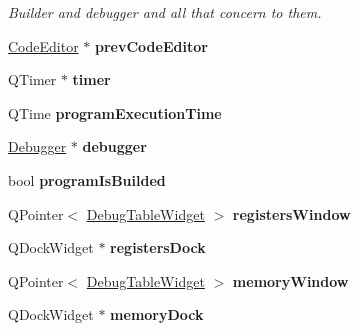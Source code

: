 \begin{DoxyCompactItemize}
\begin{DoxyCompactList}\small\item\em Builder and debugger and all that concern to them. \end{DoxyCompactList}\item 
\hypertarget{class_main_window_a0781f612c0eee901117a42f3fa457683}{}\hyperlink{class_code_editor}{Code\+Editor} $\ast$ {\bfseries prev\+Code\+Editor}\label{class_main_window_a0781f612c0eee901117a42f3fa457683}

\item 
\hypertarget{class_main_window_a356578805ed1248a7f2807434cb0e5ee}{}Q\+Timer $\ast$ {\bfseries timer}\label{class_main_window_a356578805ed1248a7f2807434cb0e5ee}

\item 
\hypertarget{class_main_window_a532375be374a745d71c38659afc235ea}{}Q\+Time {\bfseries program\+Execution\+Time}\label{class_main_window_a532375be374a745d71c38659afc235ea}

\item 
\hypertarget{class_main_window_ade3454d10164efa50487db71a9e2fbd9}{}\hyperlink{class_debugger}{Debugger} $\ast$ {\bfseries debugger}\label{class_main_window_ade3454d10164efa50487db71a9e2fbd9}

\item 
\hypertarget{class_main_window_a393e70c554043c77c719373122d8fb31}{}bool {\bfseries program\+Is\+Builded}\label{class_main_window_a393e70c554043c77c719373122d8fb31}

\item 
\hypertarget{class_main_window_a765bcdb2472bb408de635274ba564f0b}{}Q\+Pointer$<$ \hyperlink{class_debug_table_widget}{Debug\+Table\+Widget} $>$ {\bfseries registers\+Window}\label{class_main_window_a765bcdb2472bb408de635274ba564f0b}

\item 
\hypertarget{class_main_window_ae29651235c4b3e55b1475e53c949d396}{}Q\+Dock\+Widget $\ast$ {\bfseries registers\+Dock}\label{class_main_window_ae29651235c4b3e55b1475e53c949d396}

\item 
\hypertarget{class_main_window_acfa36ea58edc35ba9c1ccf85d5eb4d4c}{}Q\+Pointer$<$ \hyperlink{class_debug_table_widget}{Debug\+Table\+Widget} $>$ {\bfseries memory\+Window}\label{class_main_window_acfa36ea58edc35ba9c1ccf85d5eb4d4c}

\item 
\hypertarget{class_main_window_a23eeda6f502e86e8186877f7c2b583eb}{}Q\+Dock\+Widget $\ast$ {\bfseries memory\+Dock}\label{class_main_window_a23eeda6f502e86e8186877f7c2b583eb}


\end{DoxyCompactItemize}
